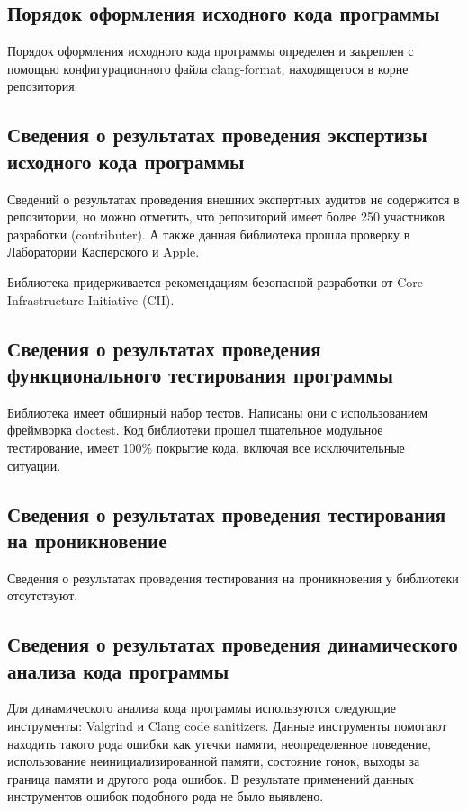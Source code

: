\subsection{Порядок оформления исходного кода программы}

Порядок оформления исходного кода программы определен и закреплен с помощью конфигурационного файла clang-format, находящегося в корне репозитория.

\subsection{Сведения о результатах проведения экспертизы исходного кода программы}

Сведений о результатах проведения внешних экспертных аудитов не содержится в репозитории, но можно отметить, что репозиторий имеет более 250 участников разработки (contributer). А также данная библиотека прошла проверку в Лаборатории Касперского и Apple.

Библиотека придерживается рекомендациям безопасной разработки от Core Infrastructure Initiative (CII).

\subsection{Сведения о результатах проведения функционального тестирования программы}

Библиотека имеет обширный набор тестов. Написаны они с использованием фреймворка doctest. Код библиотеки прошел тщательное модульное тестирование, имеет 100\% покрытие кода, включая все исключительные ситуации.

\subsection{Сведения о результатах проведения тестирования на проникновение}

Сведения о результатах проведения тестирования на проникновения у библиотеки отсутствуют.

\subsection{Сведения о результатах проведения динамического анализа кода программы}

Для динамического анализа кода программы используются следующие инструменты: Valgrind и Clang code sanitizers. Данные инструменты помогают находить такого рода ошибки как утечки памяти, неопределенное поведение, использование неинициализированной памяти, состояние гонок, выходы за граница памяти и другого рода ошибок. В результате применений данных инструментов ошибок подобного рода не было выявлено.

